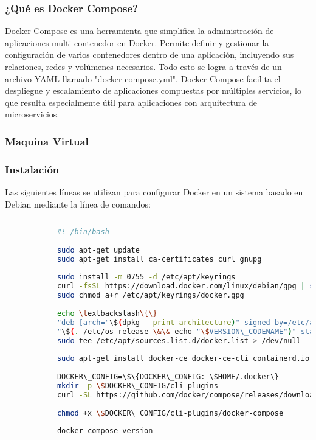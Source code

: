 			\subsubsection{¿Qué es Docker Compose?}
				Docker Compose es una herramienta que simplifica la administración de aplicaciones multi-contenedor en Docker. Permite definir y gestionar la configuración de varios contenedores dentro de una aplicación, incluyendo sus relaciones, redes y volúmenes necesarios. Todo esto se logra a través de un archivo YAML llamado "docker-compose.yml". Docker Compose facilita el despliegue y escalamiento de aplicaciones compuestas por múltiples servicios, lo que resulta especialmente útil para aplicaciones con arquitectura de microservicios.
				
	
			\subsubsection{Maquina Virtual}
			
			
			
			\subsubsection{Instalación}
			Las siguientes líneas se utilizan para configurar Docker en un sistema basado en Debian mediante la línea de comandos:
			\begin{lstlisting}[language=Bash, caption=docker]
				
			#! /bin/bash
			
			sudo apt-get update
			sudo apt-get install ca-certificates curl gnupg
			
			sudo install -m 0755 -d /etc/apt/keyrings
			curl -fsSL https://download.docker.com/linux/debian/gpg | sudo gpg --dearmor -o /etc/apt/keyrings/docker.gpg
			sudo chmod a+r /etc/apt/keyrings/docker.gpg
			
			echo \textbackslash\{\}
			"deb [arch="\$(dpkg --print-architecture)" signed-by=/etc/apt/keyrings/docker.gpg] https://download.docker.com/linux/debian \textbackslash\{\}
			"\$(. /etc/os-release \&\& echo "\$VERSION\_CODENAME")" stable" | \textbackslash\{\}
			sudo tee /etc/apt/sources.list.d/docker.list > /dev/null
			
			sudo apt-get install docker-ce docker-ce-cli containerd.io docker-buildx-plugin docker-compose-plugin
			
			DOCKER\_CONFIG=\$\{DOCKER\_CONFIG:-\$HOME/.docker\}
			mkdir -p \$DOCKER\_CONFIG/cli-plugins
			curl -SL https://github.com/docker/compose/releases/download/v2.20.0/docker-compose-linux-x86\_64 -o \$DOCKER\_CONFIG/cli-plugins/docker-compose
			
			chmod +x \$DOCKER\_CONFIG/cli-plugins/docker-compose
			
			docker compose version
			
		\end{lstlisting}
		
